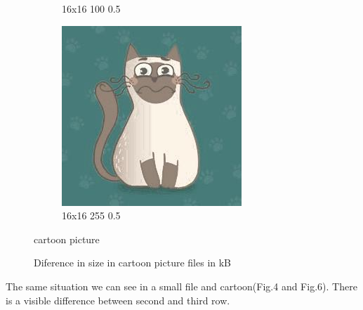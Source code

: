 \documentclass[12pt,a4paper]{article}
\begin{document}
\begin{figure}[H]
\begin{subfigure}{0.25\textwidth}
  \caption{16x16 100 0.5}
  \label{fig:11}
\end{subfigure}\hfil %
\begin{subfigure}{0.25\textwidth}
  \includegraphics[width=\linewidth]{images/cartoon/16-16-255-05}
  \caption{16x16 255 0.5}
  \label{fig:12}
\end{subfigure}


\caption{cartoon picture}
\label{fig:images}
\end{figure}

\begin{figure}[H]
    \begin{bchart}[max=200]
            \smallskip
            \smallskip
            \smallskip
            \smallskip
            \smallskip
            \smallskip
            \smallskip
            \smallskip
            \smallskip
            \smallskip
            \smallskip
            \smallskip
    \end{bchart} 
            \caption{Diference in size in cartoon picture files in kB}
    \end{figure}
The same situation we can see in a small file and cartoon(Fig.4 and Fig.6). There is a visible difference between second and third row.
\end{document}

